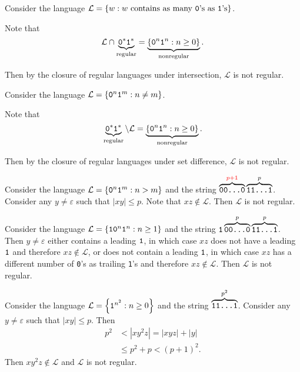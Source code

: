 \documentclass{notes}
\begin{document}
\begin{eg}
  Consider the language $\mathcal L = \left \{ w : \text{$w$ contains as many \verb~0~'s as \verb~1~'s} \right \}$.
  
  Note that 
  \[
    \mathcal L \cap \underbrace{\verb~0~^* \verb~1~^*}_\text{regular} = \underbrace{\left \{ \verb~0~^n \verb~1~^n : n \geq 0 \right \}}_\text{nonregular}.
  \]
  
  Then by the closure of regular languages under intersection, $\mathcal L$ is not regular.
\end{eg}

\begin{eg}
  Consider the language $\mathcal L = \left \{ \verb~0~^n \verb~1~^m : n \neq m \right \}$.

  Note that 
  \[
    \underbrace{\verb~0~^* \verb~1~^*}_\text{regular} \setminus \mathcal L = \underbrace{\left \{ \verb~0~^n \verb~1~^n : n \geq 0 \right \}}_\text{nonregular}.
  \]
  
  Then by the closure of regular languages under set difference, $\mathcal L$ is not regular.
\end{eg}

\begin{eg}
  Consider the language $\mathcal L = \left \{ \verb~0~^n \verb~1~^m : n > m \right \}$ and the string $\overbrace{\verb~00...0~}^{{\color{red} p + 1}} \overbrace{\verb~11...1~}^{p}$.
  Consider any $y \neq \varepsilon$ such that $\left | x y \right | \leq p$.
  Note that $x z \not \in \mathcal L$.
  Then $\mathcal L$ is not regular.
\end{eg}

\begin{eg}
  Consider the language $\mathcal L = \left \{ \verb~10~^n \verb~1~^n : n \geq 1 \right \}$ and the string $\verb~1~ \overbrace{\verb~00...0~}^{p} \overbrace{\verb~11...1~}^{p}$.
  Then $y \neq \varepsilon$ either contains a leading $\verb~1~$, in which case $x z$ does not have a leading $\verb~1~$ and therefore $x z \not \in \mathcal L$, or does not contain a leading $\verb~1~$, in which case $x z$ has a different number of \verb~0~'s as trailing \verb~1~'s and therefore $x z \not \in \mathcal L$.
  Then $\mathcal L$ is not regular.
\end{eg}

\begin{eg}
  Consider the language $\mathcal L = \left \{ \verb~1~^{n^2} : n \geq 0 \right \}$ and the string $\overbrace{\verb~11...1~}^{p^2}$.
  Consider any $y \neq \varepsilon$ such that $\left | x y \right | \leq p$.
  Then 
  \begin{align*}
    p^2 &< \left | x y^2 z \right | = \left | x y z \right | + \left | y \right | \\ 
    &\leq p^2 + p < (p + 1)^2.
  \end{align*}
  Then $x y^2 z \not \in \mathcal L$ and $\mathcal L$ is not regular.
\end{eg}
\end{document}
